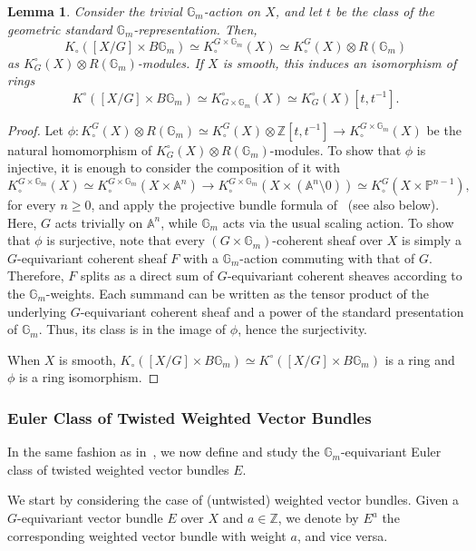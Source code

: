 \documentclass[12pt]{amsart}
\newcommand\Gm{\mathbb{G}_m}
\newcommand\Z{\mathbb{Z}}
\newcommand{\bA}{\mathbb{A}}
\newcommand{\Kring}{K^{\circ}}
\newcommand{\Kgroup}{K_{\circ}}
\newtheorem{Lemma}[theorem]{Lemma}
\theoremstyle{definition}
\begin{document}
\begin{Lemma}\label{lem: kunneth formula BGm}
    Consider the trivial $\Gm$-action on $X$, and let $t$ be the class of the geometric standard $\Gm$-representation. Then,
    \[
        \Kgroup([X/G]\times B\Gm)\simeq\Kgroup^{G\times\Gm}(X)\simeq\Kgroup^G(X)\otimes R(\Gm)
    \]
    as $\Kring_G(X)\otimes R(\Gm)$-modules. If $X$ is smooth, this induces an isomorphism of rings
    \[
        \Kring([X/G]\times B\Gm)\simeq\Kring_{G\times\Gm}(X)\simeq\Kring_G(X)[t,t^{-1}].
    \]
\end{Lemma}
\begin{proof}
    Let $\phi:\Kgroup^G(X)\otimes R(\Gm)\simeq\Kgroup^G(X)\otimes\Z[t,t^{-1}]\rightarrow\Kgroup^{G\times\Gm}(X)$ be the natural homomorphism of $\Kring_{G}(X)\otimes R(\Gm)$-modules. To show that $\phi$ is injective, it is enough to consider the composition of it with
    \[
        \Kgroup^{G\times\Gm}(X)\simeq\Kgroup^{G\times\Gm}(X\times\bA^n)\rightarrow\Kgroup^{G\times\Gm}(X\times(\bA^n\setminus0))\simeq\Kgroup^{G}(X\times\mathbb{P}^{n-1}),
    \]
    for every $n\geq0$, and apply the projective bundle formula of~\cite[Theorem 3.1]{Thomason-equivariantKtheory} (see also  below). Here, $G$ acts trivially on $\bA^n$, while $\Gm$ acts via the usual scaling action.
    To show that $\phi$ is surjective, note that every $(G\times\Gm)$-coherent sheaf over $X$ is simply a $G$-equivariant coherent sheaf $F$ with a $\Gm$-action commuting with that of $G$. Therefore, $F$ splits as a direct sum of $G$-equivariant coherent sheaves according to the $\Gm$-weights. Each summand can be written as the tensor product of the underlying $G$-equivariant coherent sheaf and a power of the standard presentation of $\Gm$. Thus, its class is in the image of $\phi$, hence the surjectivity.

    When $X$ is smooth, $\Kgroup([X/G]\times B\Gm)\simeq\Kring([X/G]\times B\Gm)$ is a ring and $\phi$ is a ring isomorphism.
\end{proof}

\subsubsection{Euler Class of Twisted Weighted Vector Bundles}\label{subsec: euler class}

In the same fashion as in~\cite{Arena-Obinna}, we now define and study the $\Gm$-equivariant Euler class of twisted weighted vector bundles $E$.

We start by considering the case of (untwisted) weighted vector bundles.
Given a $G$-equivariant vector bundle $E$ over $X$ and $a\in\Z$, we denote by $E^a$ the corresponding weighted vector bundle with weight $a$, and vice versa.
\end{document}
